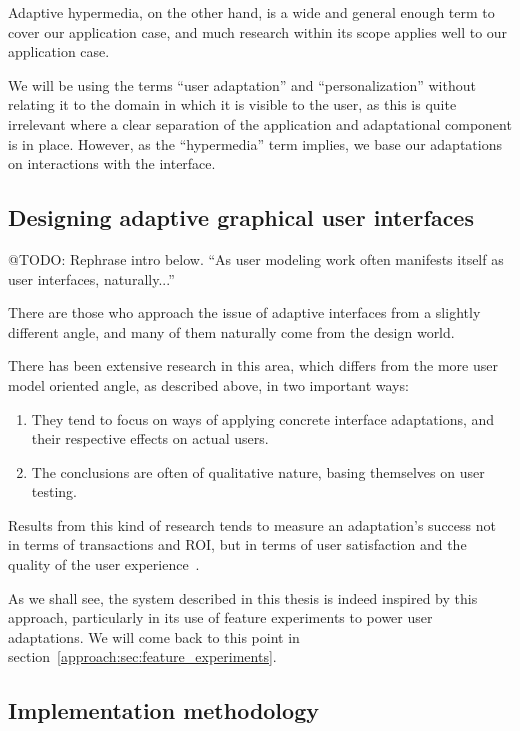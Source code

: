 Adaptive hypermedia, on the other hand, is a wide and general enough term to cover our application case, and much research within its scope applies well to our application case.

We will be using the terms ``user adaptation'' and ``personalization'' without relating it to the domain in which it is visible to the user, as this is quite irrelevant where a clear separation of the application and adaptational component is in place. However, as the ``hypermedia'' term implies, we base our adaptations on interactions with the interface.

\subsection{Designing adaptive graphical user interfaces}

@TODO: Rephrase intro below. ``As user modeling work often manifests itself as user interfaces, naturally...''

There are those who approach the issue of adaptive interfaces from a slightly different angle, and many of them naturally come from the design world.

There has been extensive research in this area, which differs from the more user model oriented angle, as described above, in two important ways:

\begin{enumerate}
  \item They tend to focus on ways of applying concrete interface adaptations, and their respective effects on actual users.
  \item The conclusions are often of qualitative nature, basing themselves on user testing.
\end{enumerate}

Results from this kind of research tends to measure an adaptation's success not in terms of transactions and ROI, but in terms of user satisfaction and the quality of the user experience~\cite{Gajos2006,Findlater2008}.

As we shall see, the system described in this thesis is indeed inspired by this approach, particularly in its use of feature experiments to power user adaptations. We will come back to this point in section~\ref{approach:sec:feature_experiments}.

\subsection{Implementation methodology}

